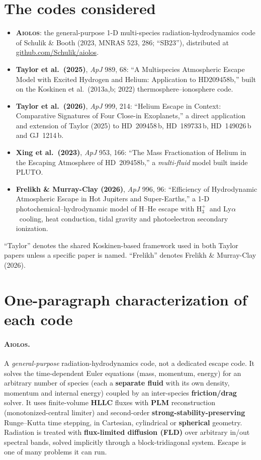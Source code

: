 \documentclass[english,a4paper]{my_memo}
\newcommand{\AIOLOS}{\textsc{Aiolos}}
\newcommand{\Lya}{Ly$\alpha$}
\newcommand{\Hth}{\ensuremath{\mathrm{H}_3^+}}
\begin{document}
\section{The codes considered}

\begin{itemize}[nosep]
  \item \textbf{\AIOLOS}: the general-purpose 1-D multi-species
    radiation-hydrodynamics code of Schulik \& Booth (2023, MNRAS 523, 286;
    ``SB23''), distributed at \url{github.com/Schulik/aiolos}.
  \item \textbf{Taylor et al.\ (2025)}, \emph{ApJ} 989, 68: ``A Multispecies
    Atmospheric Escape Model with Excited Hydrogen and Helium: Application to
    HD209458b,'' built on the Koskinen et al.\ (2013a,b; 2022)
    thermosphere--ionosphere code.
  \item \textbf{Taylor et al.\ (2026)}, \emph{ApJ} 999, 214: ``Helium Escape
    in Context: Comparative Signatures of Four Close-in Exoplanets,'' a direct
    application and extension of Taylor (2025) to HD~209458\,b,
    HD~189733\,b, HD~149026\,b and GJ~1214\,b.
  \item \textbf{Xing et al.\ (2023)}, \emph{ApJ} 953, 166: ``The Mass
    Fractionation of Helium in the Escaping Atmosphere of HD~209458b,'' a
    \emph{multi-fluid} model built inside PLUTO.
  \item \textbf{Frelikh \& Murray-Clay (2026)}, \emph{ApJ} 996, 96:
    ``Efficiency of Hydrodynamic Atmospheric Escape in Hot Jupiters and
    Super-Earths,'' a 1-D photochemical--hydrodynamic model of H--He escape
    with \Hth\ and \Lya\ cooling, heat conduction, tidal gravity and
    photoelectron secondary ionization.
\end{itemize}
``Taylor'' denotes the shared Koskinen-based framework used in both Taylor
papers unless a specific paper is named. ``Frelikh'' denotes Frelikh \&
Murray-Clay (2026).

\section{One-paragraph characterization of each code}

\paragraph{\AIOLOS.} A \emph{general-purpose} radiation-hydrodynamics code, not
a dedicated escape code. It solves the time-dependent Euler equations (mass,
momentum, energy) for an arbitrary number of species (each a
\textbf{separate fluid} with its own density, momentum and internal energy)
coupled by an inter-species \textbf{friction/drag} solver. It uses
finite-volume \textbf{HLLC} fluxes with \textbf{PLM} reconstruction
(monotonized-central limiter) and second-order
\textbf{strong-stability-preserving} Runge--Kutta time stepping, in
Cartesian, cylindrical or \textbf{spherical} geometry. Radiation is treated
with \textbf{flux-limited diffusion (FLD)} over arbitrary in/out spectral
bands, solved implicitly through a block-tridiagonal system. Escape is one of
many problems it can run.
\end{document}
